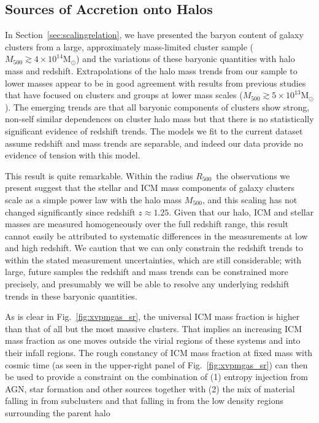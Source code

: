 \documentclass[useAMS,usenatbib,iop,numberedappendix]{mn2e}
\newcommand{\Msun}{\ensuremath{\mathrm{M}_{\odot}}}
\newcommand{\Rfiveoo}{\ensuremath{R_{500}}}
\newcommand{\Mfiveoo}{\ensuremath{M_{500}}}
\newcommand{\redshift}{\ensuremath{z}}
\begin{document}
\subsection{Sources of Accretion onto Halos}
\label{sec:infall}

In Section~\ref{sec:scalingrelation}, we have presented the baryon content of galaxy clusters from a large, approximately mass-limited cluster sample ($\Mfiveoo\gtrsim4\times10^{14}\Msun$) and the variations of these baryonic quantities with halo mass and redshift.  Extrapolations of the halo mass trends from our sample to lower masses appear to be in good agreement with results from previous studies that have focused on clusters and groups at lower mass scales ($\Mfiveoo\gtrsim5\times10^{13}\Msun$).
The emerging trends are that all baryonic components of clusters show strong, non-self similar dependences on cluster halo mass but that there is no statistically significant evidence of redshift trends.  The models we fit to the current dataset assume redshift and mass trends are separable, and indeed our data provide no evidence of tension with this model.
 
This result is quite remarkable.  Within the radius \Rfiveoo\ 
the observations we present suggest that the stellar and ICM mass components of galaxy clusters 
scale as a simple power law with the halo mass \Mfiveoo, and this scaling has not changed significantly since redshift $\redshift\approx1.25$.
Given that our halo, ICM and stellar masses are measured homogeneously over the full redshift range, this result cannot easily be attributed to systematic differences in the measurements at low and high redshift.  We caution that we can only constrain the redshift trends to within the stated measurement uncertainties, which are still considerable; with large, future samples the redshift and mass trends can be constrained more precisely, and presumably we will be able to resolve any underlying redshift trends in these baryonic quantities. 
 
As is clear in Fig.~\ref{fig:xvpmgas_sr}, the universal ICM mass fraction is higher than that of all but the most massive clusters.  That implies an increasing ICM mass fraction as one moves outside the virial regions of these systems and into their infall regions.  The rough constancy of ICM mass fraction at fixed mass with cosmic time 
(as seen in the upper-right panel of Fig.~\ref{fig:xvpmgas_sr}) can then be used to provide a constraint on the combination of (1) entropy injection from AGN, star formation and other sources together with (2) the mix of material falling in from subclusters and that falling in from the low density regions surrounding the parent halo 
\end{document}
